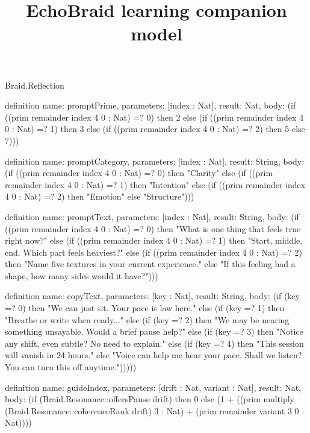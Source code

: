 \begin{lexlean}{Braid.Reflection}
\title{EchoBraid learning companion model}
\begin{semanticmodule}
definition{
  name: promptPrime,
  parameters: [index : Nat],
  result: Nat,
  body: (if ((prim remainder index 4 0 : Nat) =? 0) then 2 else (if ((prim remainder index 4 0 : Nat) =? 1) then 3 else (if ((prim remainder index 4 0 : Nat) =? 2) then 5 else 7)))
}

definition{
  name: promptCategory,
  parameters: [index : Nat],
  result: String,
  body: (if ((prim remainder index 4 0 : Nat) =? 0) then "Clarity" else (if ((prim remainder index 4 0 : Nat) =? 1) then "Intention" else (if ((prim remainder index 4 0 : Nat) =? 2) then "Emotion" else "Structure")))
}

definition{
  name: promptText,
  parameters: [index : Nat],
  result: String,
  body: (if ((prim remainder index 4 0 : Nat) =? 0) then "What is one thing that feels true right now?" else (if ((prim remainder index 4 0 : Nat) =? 1) then "Start, middle, end. Which part feels heaviest?" else (if ((prim remainder index 4 0 : Nat) =? 2) then "Name five textures in your current experience." else "If this feeling had a shape, how many sides would it have?")))
}

definition{
  name: copyText,
  parameters: [key : Nat],
  result: String,
  body: (if (key =? 0) then "We can just sit. Your pace is law here." else (if (key =? 1) then "Breathe or write when ready..." else (if (key =? 2) then "We may be nearing something unsayable. Would a brief pause help?" else (if (key =? 3) then "Notice any shift, even subtle? No need to explain." else (if (key =? 4) then "This session will vanish in 24 hours." else "Voice can help me hear your pace. Shall we listen? You can turn this off anytime.")))))
}

definition{
  name: guideIndex,
  parameters: [drift : Nat, variant : Nat],
  result: Nat,
  body: (if (Braid.Resonance::offersPause drift) then 0 else (1 + ((prim multiply (Braid.Resonance::coherenceRank drift) 3 : Nat) + (prim remainder variant 3 0 : Nat))))
}


\end{semanticmodule}
\end{lexlean}
